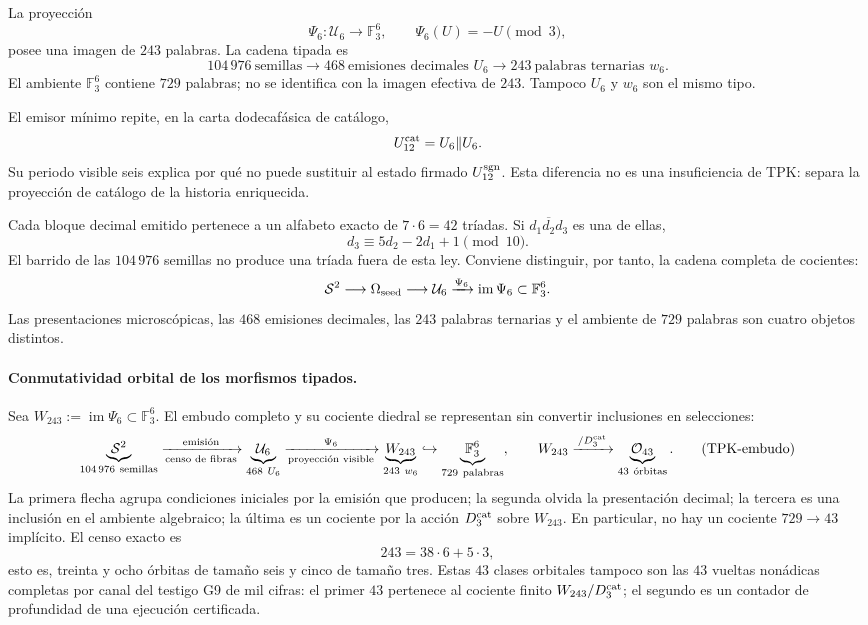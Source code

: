 La proyecci\'on
\[
 \Psi_6:\mathcal U_6\longrightarrow\mathbb F_3^6,
 \qquad \Psi_6(U)=-U\pmod3,
\]
posee una imagen de \(243\) palabras. La cadena tipada es
\[
 104\,976\ \text{semillas}
 \longrightarrow468\ \text{emisiones decimales }U_6
 \longrightarrow243\ \text{palabras ternarias }w_6.
\]
El ambiente \(\mathbb F_3^6\) contiene \(729\) palabras; no se identifica
con la imagen efectiva de \(243\). Tampoco \(U_6\) y \(w_6\) son el mismo
tipo.

El emisor m\'inimo repite, en la carta dodecaf\'asica de cat\'alogo,
\[
 U_{12}^{\rm cat}=U_6\Vert U_6.
\]
Su periodo visible seis explica por qu\'e no puede sustituir al estado firmado
\(U_{12}^{\rm sgn}\). Esta diferencia no es una insuficiencia de TPK: separa
la proyecci\'on de cat\'alogo de la historia enriquecida.

Cada bloque decimal emitido pertenece a un alfabeto exacto de
\(7\cdot6=42\) tríadas. Si \(\overline{d_1d_2d_3}\) es una de ellas,
\[
 \boxed{d_3\equiv5d_2-2d_1+1\pmod{10}.}
\]
El barrido de las \(104\,976\) semillas no produce una tríada fuera de esta
ley. Conviene distinguir, por tanto, la cadena completa de cocientes:
\[
 \mathcal S^2
 \longrightarrow\Omega_{\rm seed}
 \longrightarrow\mathcal U_6
 \xrightarrow{\Psi_6}\operatorname{im}\Psi_6\subset\mathbb F_3^6.
\]
Las presentaciones microscópicas, las \(468\) emisiones decimales, las
\(243\) palabras ternarias y el ambiente de \(729\) palabras son cuatro
objetos distintos.

\paragraph{Conmutatividad orbital de los morfismos tipados.}
Sea
\(W_{243}:=\operatorname{im}\Psi_6\subset\mathbb F_3^6\). El embudo
completo y su cociente diedral se representan sin convertir inclusiones en
selecciones:
\[
 \underbrace{\mathcal S^2}_{104\,976\ \mathrm{semillas}}
 \xrightarrow[\text{censo de fibras}]{\text{emisión}}
 \underbrace{\mathcal U_6}_{468\ U_6}
 \xrightarrow[\text{proyección visible}]{\Psi_6}
 \underbrace{W_{243}}_{243\ w_6}
 \hookrightarrow
 \underbrace{\mathbb F_3^6}_{729\ \mathrm{palabras}},
 \qquad
 W_{243}\xrightarrow{\,/D_3^{\rm cat}\,}
 \underbrace{\mathcal O_{43}}_{43\ \text{\'orbitas}}.
 \tag{TPK-embudo}\label{eq:embudo-orbital-tipado-rev8}
\]
La primera flecha agrupa condiciones iniciales por la emisión que producen;
la segunda olvida la presentación decimal; la tercera es una inclusión en
el ambiente algebraico; la última es un cociente por la acción
\(D_3^{\rm cat}\) sobre \(W_{243}\). En particular, no hay un cociente
\(729\to43\) implícito. El censo exacto es
\[
 243=38\cdot6+5\cdot3,
\]
esto es, treinta y ocho órbitas de tamaño seis y cinco de tamaño tres.
Estas \(43\) clases orbitales tampoco son las \(43\) vueltas nonádicas
completas por canal del testigo G9 de mil cifras: el primer \(43\) pertenece
al cociente finito \(W_{243}/D_3^{\rm cat}\); el segundo es un contador de
profundidad de una ejecución certificada.

